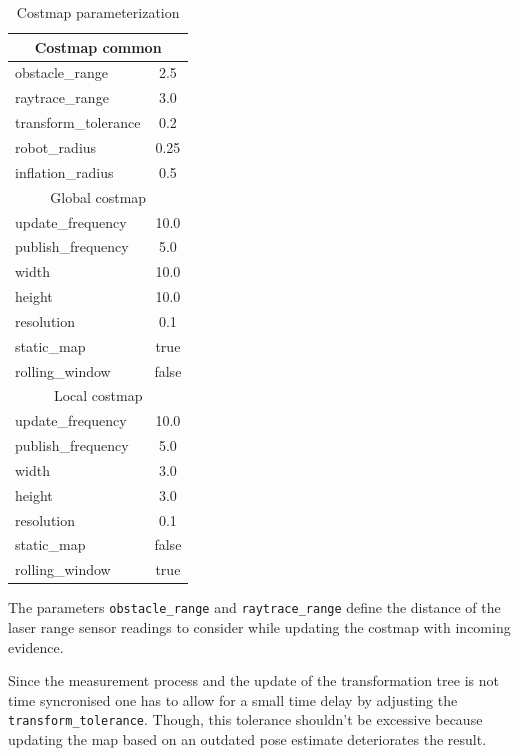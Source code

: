 \documentclass[10pt,journal,compsoc]{IEEEtran}
\begin{document}
\begin{table}[h]
      \caption{Costmap parameterization}
      \label{tab:costmap_parameterization}
      \begin{center}
            \begin{tabular}{|l|c|}  
\multicolumn{2}{c}{Costmap common} \\ \hline 
obstacle\_range & 2.5  \\ \hline
raytrace\_range & 3.0  \\ \hline
transform\_tolerance& 0.2 \\ \hline
robot\_radius& 0.25 \\ \hline
inflation\_radius & 0.5 \\ \hline 

\multicolumn{2}{c}{Global costmap} \\ \hline 
   update\_frequency &  10.0 \\ \hline
   publish\_frequency &  5.0 \\ \hline
   width &  10.0 \\ \hline
   height &  10.0 \\ \hline
   resolution &  0.1 \\ \hline
   static\_map &  true \\ \hline
   rolling\_window &  false \\ \hline

\multicolumn{2}{c}{Local costmap} \\ \hline 
   update\_frequency &  10.0 \\ \hline
   publish\_frequency &  5.0 \\ \hline
   width &  3.0 \\ \hline
   height &  3.0 \\ \hline
   resolution &  0.1 \\ \hline
   static\_map &  false \\ \hline
   rolling\_window &  true \\ \hline
            \end{tabular}
      \end{center}
\end{table}

The parameters \texttt{obstacle\_range} and \texttt{raytrace\_range} define the distance of the laser range sensor readings to consider while updating the costmap with incoming evidence.

Since the measurement process and the update of the transformation tree is not time syncronised one has to allow for a small time delay by adjusting the \texttt{transform\_tolerance}. Though, this tolerance shouldn't be excessive because updating the map based on an outdated pose estimate deteriorates the result.
\end{document}
